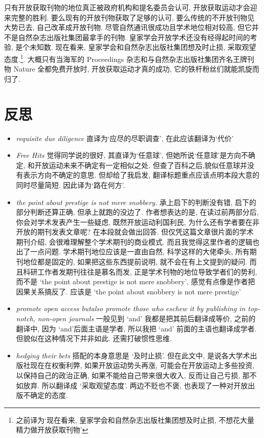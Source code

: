 \documentclass[a4paper, 12pt, UTF8]{article}
\begin{document}
只有开放获取刊物的地位真正被政府机构和提名委员会认可, 开放获取运动才会迎来完整的胜利. 要么现有的开放刊物获取了足够的认可, 要么传统的不开放刊物见大势已去, 自己改革成开放刊物. 尽管自然通讯很成功且学术地位相对较高, 但它并不是自然杂志出版社集团最拿手的刊物. 皇家学会开放学术还没有经得起时间的考验, 是个未知数. 现在看来, 皇家学会和自然杂志出版社集团想及时止损, 采取观望态度.\footnote[5]{之前译为`现在看来, 皇家学会和自然杂志出版社集团想及时止损, 不想花大量精力做开放获取刊物'}. 大概只有当海军的 Proceedings 杂志和与自然杂志出版社集团齐名王牌刊物 Nature 全都免费开放时, 开放获取运动才真的成功, 它的铁杆粉丝们就能凯旋而归了.

\section{反思}
\begin{itemize}
    \item \emph{requisite due diligence} 直译为`应尽的尽职调查', 在此应该翻译为`代价'
    \item \emph{Free Hits} 觉得同学说的很好, 其直译为`任意球', 但她所说`任意球'是方向不确定, 和开放运动未来不确定有一定相似之处. 但查了百科之后,貌似任意球并没有表示方向不确定的意思. 但却给了我启发, 翻译标题重点应该点明本段大意的同时尽量简短. 因此译为`路在何方'.
    \item \emph{the point about prestige is not mere snobbery.} 承上启下的判断没有错, 启下的部分判断还算正确, 但承上就跑的没边了. 作者想表达的是, 在读过前两部分后, 你会对学术发表产生一些疑虑, 既然开放运动利国利民, 为什么还有学者要在非开放的期刊发表文章呢? 在本段就会做出回答. 但仅凭这篇文章很片面的学术期刊介绍, 会很难理解整个学术期刊的商业模式. 而且我觉得这里作者的逻辑也出了一点问题. 学术期刊地位应该是一直由自然, 科学这样的大佬牵头, 所有期刊地位都是固定的, 如果把这些东西提前说明, 就不会在有上文提到的疑问. 而且科研工作者发期刊往往是慕名而发, 正是学术刊物的地位导致学者们的势利, 而不是 `the point about prestige is not mere snobbery', 感觉有点像是作者把因果关系搞反了. 应该是 `the point about snobbery is not mere prestige'
    \item \emph{promote open access butalso promote those who eschew it by publishing in top-notch, non-open journals} 一般见到 `and' 我都是把其前后翻译成等价, 之前的翻译中, 因为 `and'后面主语是学者, 所以我把 `and' 前面的主语也翻译成学者. 但貌似在这种情况下并非如此. 还需打破惯性思维.
    \item \emph{hedging their bets} 搭配的本身意思是 `及时止损'. 但在此文中, 是说各大学术出版社现在在权衡利弊, 如果开放运动势头再涨, 可能会在开放运动上多些投资, 以保持自己的政治正确, 如果不能给自己带来很大收入, 反而让自己亏损, 那不如放弃. 所以翻译成 `采取观望态度'. 两边不贬也不褒, 也表现了一种对开放出版不确定的态度.

\end{itemize}
\end{document}
